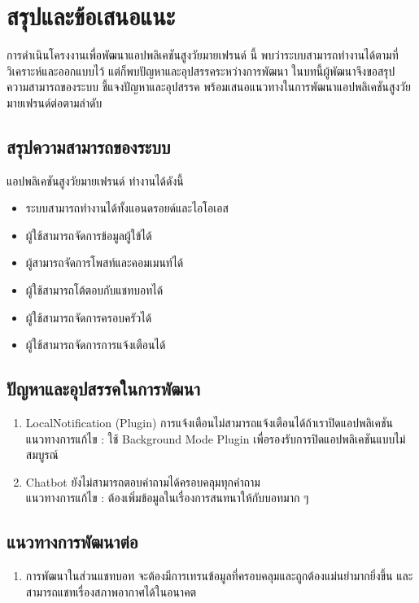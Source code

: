 \chapter{สรุปและข้อเสนอแนะ}

การดำเนินโครงงานเพื่อพัฒนาแอปพลิเคชันสูงวัยมายเฟรนด์ นี้ พบว่าระบบสามารถทำงานได้ตามที่วิเคราะห์และออกแบบไว้ แต่ก็พบปัญหาและอุปสรรคระหว่างการพัฒนา ในบทนี้ผู้พัฒนาจึงขอสรุปความสามารถของระบบ ชี้แจงปัญหาและอุปสรรค พร้อมเสนอแนวทางในการพัฒนาแอปพลิเคชันสูงวัยมายเฟรนด์ต่อตามลำดับ

\section{สรุปความสามารถของระบบ}
	แอปพลิเคชันสูงวัยมายเฟรนด์ ทำงานได้ดังนี้
		\begin{itemize}
			\item ระบบสามารถทำงานได้ทั้งแอนดรอยด์และไอโอเอส
			\item ผู้ใช้สามารถจัดการข้อมูลผู้ใข้ได้
			\item ผู้สามารถจัดการโพสท์และคอมเมนท์ได้
			\item ผู้ใช้สามารถโต้ตอบกับแชทบอทได้
			\item ผู้ใช้สามารถจัดการครอบครัวได้
			\item ผู้ใช้สามารถจัดการการแจ้งเตือนได้
		\end{itemize}
	
\section{ปัญหาและอุปสรรคในการพัฒนา}
  \begin{enumerate}[label=\arabic*)]

	\item LocalNotification (Plugin) การแจ้งเตือนไม่สามารถแจ้งเตือนได้ถ้าเราปิดแอปพลิเคชัน \\ 
   แนวทางการแก้ไข : ใช้ Background Mode Plugin เพื่อรองรับการปิดแอปพลิเคชันแบบไม่สมบูรณ์

   \item Chatbot ยังไม่สามารถตอบคำถามได้ครอบคลุมทุกคำถาม \\ 
   แนวทางการแก้ไข : ต้องเพิ่มข้อมูลในเรื่องการสนทนาให้กับบอทมาก ๆ
    
  \end{enumerate}

\section{แนวทางการพัฒนาต่อ}
\begin{enumerate}[label=\arabic*)]
	\item การพัฒนาในส่วนแชทบอท จะต้องมีการเทรนข้อมูลที่ครอบคลุมและถูกต้องแม่นยำมากยิ่งขึ้น และสามารถแชทเรื่องสภาพอากาศได้ในอนาคต
\end{enumerate}




